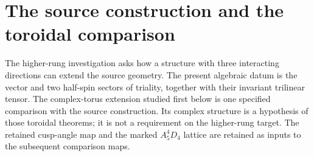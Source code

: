 \documentclass[11pt]{article}
\theoremstyle{definition}
\begin{document}
\section{The source construction and the toroidal comparison}

The higher-rung investigation asks how a structure with three interacting
directions can extend the source geometry. The present algebraic datum is
the vector and two half-spin sectors of triality, together with their
invariant trilinear tensor. The complex-torus extension studied first below
is one specified comparison with the source construction. Its complex
structure is a hypothesis of those toroidal theorems; it is not a
requirement on the higher-rung target. The retained cusp-angle map and the
marked $A_5^4D_4$ lattice are retained as inputs to the subsequent comparison
maps.
\end{document}
